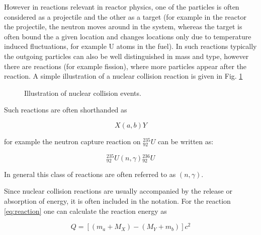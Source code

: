 However in reactions relevant in reactor physics, one of the particles is often considered as a projectile and the other as a target (for example in the reactor the projectile, the neutron moves around in the system, whereas the target is often bound the a given location and changes locations only due to temperature induced fluctuations, for example U atoms in the fuel). In such reactions typically the outgoing particles can also be well distinguished in mass and type, however there are reactions (for example fission), where more particles appear after the reaction. A simple illustration of a nuclear collision reaction is given in Fig. \ref{fig:reactions}

\begin{figure}[ht!]
\protect {}\protect
\caption{\label{fig:reactions} \footnotesize{Illustration of nuclear collision events.}}
\end{figure}

Such reactions are often shorthanded as

\[
X(a,b)Y
\]

for example the neutron capture reaction on ${}_{92}^{235}U$ can be written as:

\[
{}_{92}^{235}U(n,\gamma){}_{92}^{236}U
\]

In general this class of reactions are often referred to as $(n,\gamma)$.

Since nuclear collision reactions are usually accompanied by the release or absorption of energy, it is often included in the notation. For the reaction \eqref{eq:reaction} one can calculate the reaction energy as

\begin{equation}\label{eq:reactionQ}
Q=[(m_a+M_X)-(M_Y+m_b)]c^2
\end{equation}

